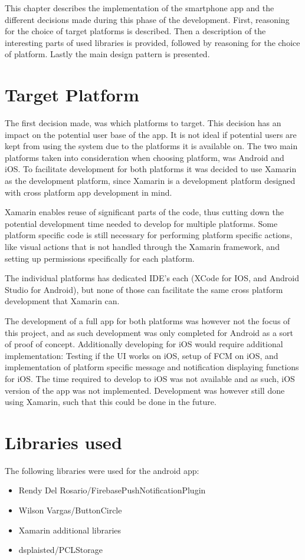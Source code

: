 This chapter describes the implementation of the smartphone app and the different decisions made during this phase of the development. 
First, reasoning for the choice of target platforms is described. Then a description of the interesting parts of used libraries is provided, followed by reasoning for the choice of platform. Lastly the main design pattern is presented.

\section{Target Platform}\label{sec:targetplatform}
The first decision made, was which platforms to target. This decision has an impact on the potential user base of the app. It is not ideal if potential users are kept from using the system due to the platforms it is available on.
The two main platforms taken into consideration when choosing platform, was Android and iOS. To facilitate development for both platforms it was decided to use Xamarin \cite{xamarin} as the development platform, since Xamarin is a development platform designed with cross platform app development in mind. 

Xamarin enables reuse of significant parts of the code, thus cutting down the potential development time needed to develop for multiple platforms. Some platform specific code is still necessary for performing platform specific actions, like visual actions that is not handled through the Xamarin framework, and setting up permissions specifically for each platform. 

The individual platforms has dedicated IDE’s each (XCode \cite{xcode} for IOS, and Android Studio for Android), but none of those can facilitate the same cross platform development that Xamarin can.

The development of a full app for both platforms was however not the focus of this project, and as such development was only completed for Android as a sort of proof of concept. Additionally developing for iOS would require additional implementation: Testing if the UI works on iOS, setup of FCM on iOS, and implementation of platform specific message and notification displaying functions for iOS. The time required to develop to iOS was not available and as such, iOS version of the app was not implemented. Development was however still done using Xamarin, such that this could be done in the future.

\section{Libraries used}
The following libraries were used for the android app:
\begin{itemize}
    \item Rendy Del Rosario/FirebasePushNotificationPlugin
    \item Wilson Vargas/ButtonCircle
    \item Xamarin additional libraries
    \item dsplaisted/PCLStorage
\end{itemize}

